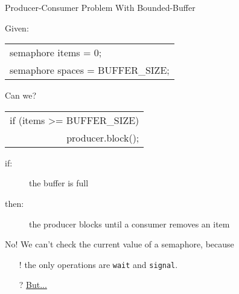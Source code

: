
\begin{frame}{Producer-Consumer Problem With Bounded-Buffer}
  \begin{block}{Given:}
    \begin{center}
      \begin{tabular}{>{\ttfamily}l}
        semaphore items = 0;\\
        semaphore spaces = BUFFER\_SIZE;
      \end{tabular}
    \end{center}
  \end{block}
  \begin{block}{Can we?}
    \begin{center}
      \begin{tabular}{>{\ttfamily}r}
        if (items >= BUFFER\_SIZE)\\
        producer.block();
      \end{tabular}
    \end{center}
    \begin{description}
    \item[if:] the buffer is full
    \item[then:] the producer blocks until a consumer removes an item
    \end{description}
  \end{block}
  \pause 
  \alert{No!} We can't check the current value of a semaphore, because
  \begin{itemize}
  \item[!] \alert{the only operations are \texttt{wait} and \texttt{signal}}.
  \item[?] \hyperlink{comp}{But...}
  \end{itemize}
\end{frame}

